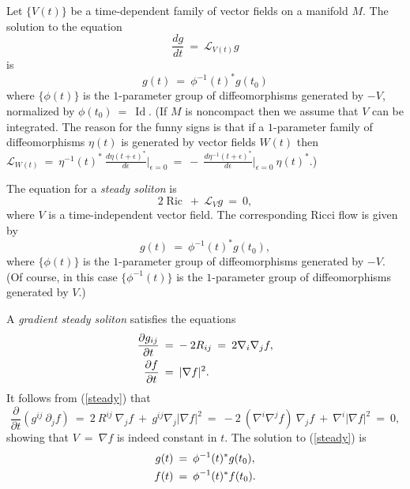 \documentclass[12pt]{amsart}
\newcommand{\Id}{\operatorname{Id}}
\newcommand{\Ric}{\operatorname{Ric}}
\numberwithin{equation}{section}
\theoremstyle{plain}
\theoremstyle{definition}
\theoremstyle{remark}
\begin{document}
Let $\{V(t)\}$ be a time-dependent family of vector fields on a manifold $M$.
The solution to the equation
\begin{equation}
\frac{dg}{dt} \: = \: {\mathcal L}_{V(t)} g
\end{equation}
is 
\begin{equation}
g(t) \: = \: \phi^{-1}(t)^* g(t_0)
\end{equation}
where $\{ \phi(t) \}$ is the $1$-parameter group of diffeomorphisms generated 
by $- V$, normalized by $\phi(t_0) \: = \: \Id$.
(If $M$ is noncompact then we assume that $V$ can be integrated.
The reason for the funny signs is that if a $1$-parameter family of
diffeomorphisms $\eta(t)$ is generated by vector fields $W(t)$ then
${\mathcal L}_{W(t)} \: = \: \eta^{-1}(t)^* \:
\frac{d\eta(t+\epsilon)^*}{d\epsilon} \Big|_{\epsilon = 0} \: = \: - \:
\frac{d\eta^{-1}(t+\epsilon)^*}{d\epsilon} \Big|_{\epsilon = 0} \: \eta(t)^*$.)

The equation for a {\em steady soliton} is
\begin{equation}
2 \Ric \: + \: {\mathcal L}_V g \: = \: 0,
\end{equation}
where $V$ is a time-independent
vector field.
The corresponding Ricci flow is given by
\begin{equation}
g(t) \: = \: \phi^{-1}(t)^* g(t_0),
\end{equation}
where $\{ \phi(t) \}$ is the $1$-parameter group of diffeomorphisms generated 
by $- V$. (Of course, in this case
$\{ \phi^{-1}(t) \}$ is the $1$-parameter group of diffeomorphisms generated 
by $V$.)

A {\em gradient steady soliton}
satisfies the equations
\begin{align} \label{steady}
\frac{\partial g_{ij}}{\partial t} \: & = \: - \: 2 R_{ij} \: = \:
2 \nabla_i \nabla_j f, \\
\frac{\partial f}{\partial t} \: & = \: |\nabla f|^2. \notag
\end{align}
It follows from (\ref{steady}) that
\begin{equation}
\frac{\partial}{\partial t} \left( g^{ij} \: \partial_j f \right) \: = \:
2 \: R^{ij} \: \nabla_j f \: + \: g^{ij} \nabla_j |\nabla f|^2 \: = \:
- 2 \: (\nabla^i \nabla^j f) \: \nabla_j f \: + \: \nabla^i
|\nabla f|^2 \: = \: 0,
\end{equation}
showing that $V \: = \: \nabla f$ is indeed constant in $t$.
The solution to (\ref{steady}) is
\begin{align} \label{steadysoln}
g(t) \: & = \: \phi^{-1}(t)^* g(t_0), \\
f(t) \: & = \: \phi^{-1}(t)^* f(t_0). \notag
\end{align}
\end{document}
